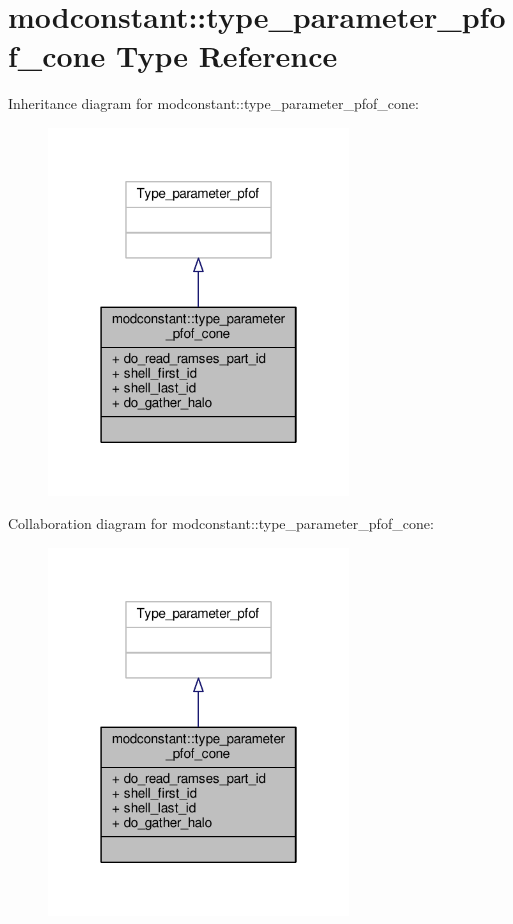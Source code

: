 \hypertarget{structmodconstant_1_1type__parameter__pfof__cone}{}\section{modconstant\+:\+:type\+\_\+parameter\+\_\+pfof\+\_\+cone Type Reference}
\label{structmodconstant_1_1type__parameter__pfof__cone}


Inheritance diagram for modconstant\+:\+:type\+\_\+parameter\+\_\+pfof\+\_\+cone\+:\nopagebreak
\begin{figure}[H]
\begin{center}
\leavevmode
\includegraphics[width=226pt]{structmodconstant_1_1type__parameter__pfof__cone__inherit__graph}
\end{center}
\end{figure}


Collaboration diagram for modconstant\+:\+:type\+\_\+parameter\+\_\+pfof\+\_\+cone\+:\nopagebreak
\begin{figure}[H]
\begin{center}
\leavevmode
\includegraphics[width=226pt]{structmodconstant_1_1type__parameter__pfof__cone__coll__graph}
\end{center}
\end{figure}
